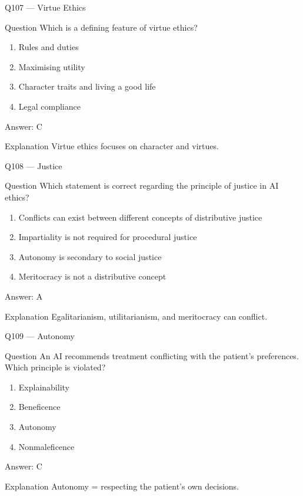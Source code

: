 \documentclass[aspectratio=169,8pt]{beamer}
\begin{document}
	\begin{frame}{Q107 --- Virtue Ethics}
		\begin{block}{Question}
			Which is a defining feature of virtue ethics?
		\end{block}
		\begin{enumerate}
			\item Rules and duties
			\item Maximising utility
			\item Character traits and living a good life
			\item Legal compliance
		\end{enumerate}
		\begin{exampleblock}{Answer: C}\end{exampleblock}
		\begin{block}{Explanation}
			Virtue ethics focuses on character and virtues.
		\end{block}
	\end{frame}
	
	\begin{frame}{Q108 --- Justice}
		\begin{block}{Question}
			Which statement is correct regarding the principle of justice in AI ethics?
		\end{block}
		\begin{enumerate}
			\item Conflicts can exist between different concepts of distributive justice
			\item Impartiality is not required for procedural justice
			\item Autonomy is secondary to social justice
			\item Meritocracy is not a distributive concept
		\end{enumerate}
		\begin{exampleblock}{Answer: A}\end{exampleblock}
		\begin{block}{Explanation}
			Egalitarianism, utilitarianism, and meritocracy can conflict.
		\end{block}
	\end{frame}
	
	\begin{frame}{Q109 --- Autonomy}
		\begin{block}{Question}
			An AI recommends treatment conflicting with the patient's preferences. Which principle is violated?
		\end{block}
		\begin{enumerate}
			\item Explainability
			\item Beneficence
			\item Autonomy
			\item Nonmaleficence
		\end{enumerate}
		\begin{exampleblock}{Answer: C}\end{exampleblock}
		\begin{block}{Explanation}
			Autonomy = respecting the patient's own decisions.
		\end{block}
	\end{frame}
	
\end{document}
